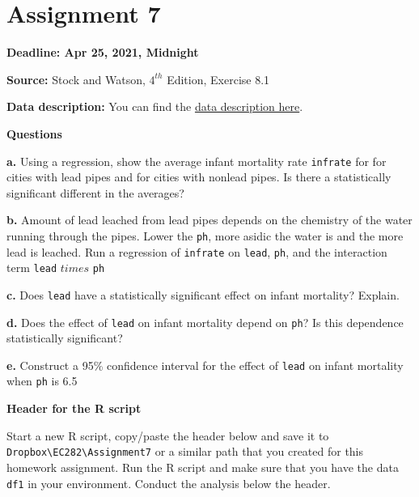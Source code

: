 \documentclass[
]{book}
\begin{document}
\hypertarget{assignment-7}{%
\section{Assignment 7}\label{assignment-7}}

\textbf{Deadline: Apr 25, 2021, Midnight}

\textbf{Source:} Stock and Watson, \(4^{th}\) Edition, Exercise 8.1

\textbf{Data description:} You can find the \href{https://www.dropbox.com/s/xdensdqj97bf2cj/Lead_Mortality_Description.pdf?dl=1}{data description here}.

\textbf{Questions}

\textbf{a.} Using a regression, show the average infant mortality rate \texttt{infrate} for for cities with lead pipes and for cities with nonlead pipes. Is there a statistically significant different in the averages?

\textbf{b.} Amount of lead leached from lead pipes depends on the chemistry of the water running through the pipes. Lower the \texttt{ph}, more asidic the water is and the more lead is leached. Run a regression of \texttt{infrate} on \texttt{lead}, \texttt{ph}, and the interaction term \texttt{lead} \(times\) \texttt{ph}

\textbf{c.} Does \texttt{lead} have a statistically significant effect on infant mortality? Explain.

\textbf{d.} Does the effect of \texttt{lead} on infant mortality depend on \texttt{ph}? Is this dependence statistically significant?

\textbf{e.} Construct a 95\% confidence interval for the effect of \texttt{lead} on infant mortality when \texttt{ph} is 6.5

\textbf{Header for the R script}

Start a new R script, copy/paste the header below and save it to \texttt{Dropbox\textbackslash{}EC282\textbackslash{}Assignment7} or a similar path that you created for this homework assignment. Run the R script and make sure that you have the data \texttt{df1} in your environment. Conduct the analysis below the header.
\end{document}
